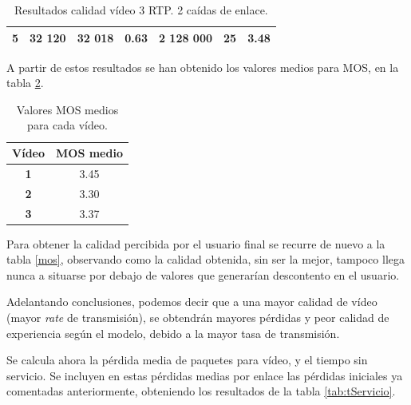 \documentclass[a4paper,11pt]{book}
\begin{document}
\begin{table}[tb]
\begin{tabular}{|c|c|c|c|c|c|c|}
{\bf 5}       & 32 120                                                             & 32 018                                                              & 0.63                                                          & 2 128 000        & 25                                                                 & 3.48                                                        \\ \hline
\end{tabular}
\caption{Resultados calidad vídeo 3 \ac{RTP}. 2 caídas de enlace.}
\label{tab:calidad3}
\end{table}

A partir de estos resultados se han obtenido los valores medios para \ac{MOS}, en la tabla \ref{tab:mediumMOS}.

\begin{table}[tb]
\centering
\begin{tabular}{|c|c|}
\hline
{\bf Vídeo} & {\bf MOS medio} \\ \hline
{\bf 1}     & 3.45            \\ \hline
{\bf 2}     & 3.30            \\ \hline
{\bf 3}     & 3.37            \\ \hline
\end{tabular}
\caption{Valores \ac{MOS} medios para cada vídeo.}
\label{tab:mediumMOS}
\end{table}

Para obtener la calidad percibida por el usuario final se recurre de nuevo a la tabla \ref{mos}, observando como la calidad obtenida, sin ser la mejor, tampoco llega nunca a situarse por debajo de valores que generarían descontento en el usuario.

Adelantando conclusiones, podemos decir que a una mayor calidad de vídeo (mayor \textit{rate} de transmisión), se obtendrán mayores pérdidas y peor calidad de experiencia según el modelo, debido a la mayor tasa de transmisión.

Se calcula ahora la pérdida media de paquetes para vídeo, y el tiempo sin servicio. Se incluyen en estas pérdidas medias por enlace las pérdidas iniciales ya comentadas anteriormente, obteniendo los resultados de la tabla \ref{tab:tServicio}.
\end{document}
